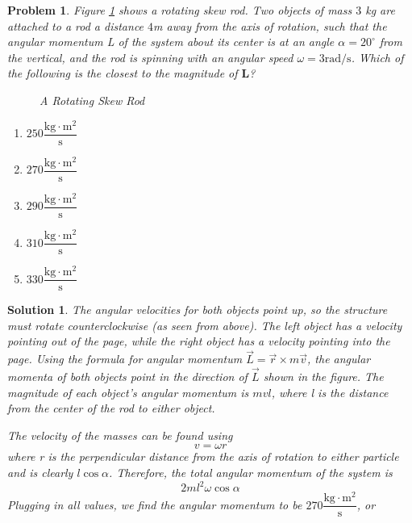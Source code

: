 \documentclass[12pt]{article}
\newcommand{\clearpts}{\addtocounter{tpts}{\value{cpts}} \setcounter{cpts}{0}}
\newcommand{\pts}[1]{\clearpts \setcounter{cpts}{#1}}
\newtheorem*{solution}{Solution}
\theoremstyle{mystyle}
\newtheorem{pproblem}{Problem}
\newcommand{\AxisRotater}[1][rotate=0]{
  \tikz [x=0.25cm,y=0.60cm,line width=.2ex,-stealth,#1] \draw (0,0) arc (-150:150:1 and 1);
}
\begin{document}
\pts{2}
\begin{pproblem}
    Figure \ref{skew rod} shows a rotating skew rod. Two objects of mass $3$ kg are attached to a rod a distance $4$m away from the axis of rotation,
    such that the angular momentum L of the system about its center is at an angle $\alpha=20^\circ$ from the vertical, and
    the rod is spinning with an angular speed $\omega=3\mathrm{rad/s}$. Which of the following is the closest to the magnitude of $\mathbf{L}$?

    \begin{figure}[H]
        \centering
        \caption{A Rotating Skew Rod}
        \label{skew rod}
    \end{figure}
    \begin{enumerate}[(\Alph*)]
        \item $250\mathrm{\dfrac{kg\cdot m^2}{s}}$
        \item $270\mathrm{\dfrac{kg\cdot m^2}{s}}$
        \item $290\mathrm{\dfrac{kg\cdot m^2}{s}}$
        \item $310\mathrm{\dfrac{kg\cdot m^2}{s}}$
        \item $330\mathrm{\dfrac{kg\cdot m^2}{s}}$
    \end{enumerate}
\end{pproblem}
\begin{solution}
    The angular velocities for both objects point up, so the structure must rotate counterclockwise (as seen from above). The left object has a velocity pointing out of the page, while the right object has a velocity pointing into the page. Using the formula for angular momentum $\Vec{L} = \Vec{r} \times m\Vec{v}$, the angular momenta of both objects point in the direction of $\Vec{L}$ shown in the figure. The magnitude of each object's angular momentum is $mvl$, where l is the distance from the center of the rod to either object. 
    
    The velocity of the masses can be found using $$v = \omega r$$ where r is the perpendicular distance from the axis of rotation to either particle and is clearly $l\cos \alpha$. Therefore, the total angular momentum of the system is 
    $$2ml^2\omega \cos \alpha$$
    Plugging in all values, we find the angular momentum to be $270\mathrm{\dfrac{kg\cdot m^2}{s}}$, or 
\end{solution}
\end{document}
